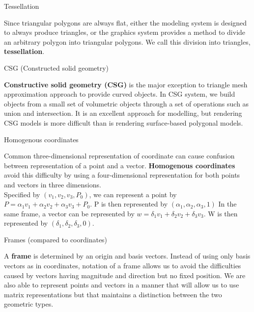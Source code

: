 \documentclass[10pt,a4paper]{article}
\begin{document}
\begin{enumerate}
		{\large \item Tessellation}
				
			Since triangular polygons are always flat, either the modeling system is designed to always produce triangles, or the graphics system provides a method to divide an arbitrary polygon into triangular polygons. We call this division into triangles, \textbf{tessellation}.\\
			
		{\large \item CSG (Constructed solid geometry)}
				
			\textbf{Constructive solid geometry (CSG)} is the major exception to triangle mesh approximation approach to provide curved objects. In CSG system, we build objects from a small set of volumetric objects through a set of operations such as union and intersection. It is an excellent approach for modelling, but rendering CSG models is more difficult than is rendering surface-based polygonal models.\\
				
		{\large \item Homogenous coordinates}
				
			Common three-dimensional representation of coordinate can cause confusion between representation of a point and a vector. \textbf{Homogenous coordinates} avoid this difficulty by using a four-dimensional representation for both points and vectors in three dimensions.\\
			Specified by $ (v_1, v_2, v_3, P_0) $, we can represent a point by $ P = \alpha_1 v_1 + \alpha_2 v_2 + \alpha_3 v_3 + P_0 $. P is then represented by $ (\alpha_1, \alpha_2, \alpha_3, 1) $ In the same frame, a vector can be represented by $ w = \delta_1 v_1 + \delta_2 v_2 + \delta_3v_3 $. W is then represented by $ (\delta_1, \delta_2, \delta_3, 0) $.\\
			
		{\large \item Frames (compared to coordinates)}
				
			A \textbf{frame} is determined by an origin and basis vectors. Instead of using only basis vectors as in coordinates, notation of a frame allows us to avoid the difficulties caused by vectors having magnitude and direction but no fixed position. We are also able to represent points and vectors in a manner that will allow us to use matrix representations but that maintains a distinction between the two geometric types.\\
			

\end{enumerate}
\end{document}
